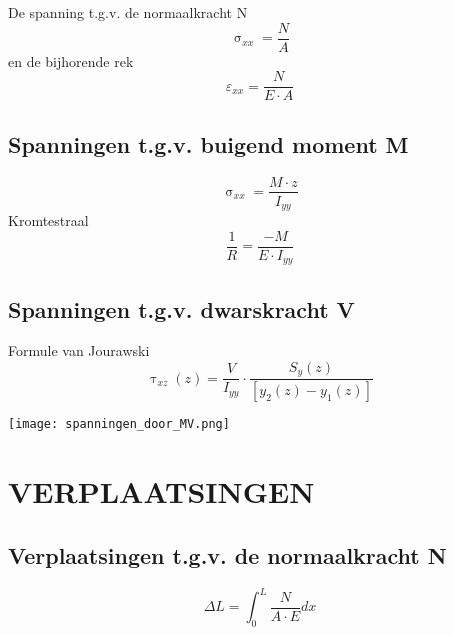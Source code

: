             De spanning t.g.v. de normaalkracht N
            \begin{equation}
                \upsigma_{xx} = \frac{N}{A}
            \end{equation}
            en de bijhorende rek
            \begin{equation}
                \varepsilon_{xx} = \frac{N}{E\cdot A}
            \end{equation}

        \subsection{Spanningen t.g.v. buigend moment M}

            \begin{equation}
                \upsigma_{xx} = \frac{M\cdot z}{I_{yy}}
            \end{equation}
            Kromtestraal
            \begin{equation}
                \frac{1}{R} = \frac{-M}{E\cdot I_{yy}}
            \end{equation}

        \subsection{Spanningen t.g.v. dwarskracht V}

            Formule van Jourawski
            \begin{equation}
                \uptau_{xz}(z) = \frac{V}{I_{yy}}\cdot\frac{S_{y}(z)}{[y_2(z)-y_1(z)]}
            \end{equation}

            \begin{center}
                \texttt{[image: spanningen\_door\_MV.png]}
            \end{center}

    \section{VERPLAATSINGEN}

        \subsection{Verplaatsingen t.g.v. de normaalkracht N}

            \begin{equation}
                \Delta L = \int_0^L\frac{N}{A\cdot E}dx
            \end{equation}

